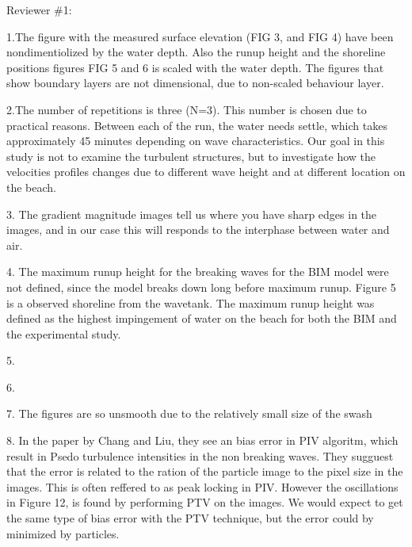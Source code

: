 Reviewer \#1:

1.The figure with the measured surface elevation (FIG 3, and  FIG 4) have been  nondimentiolized  by the water depth. Also the runup height and the shoreline positions figures FIG 5 and 6 is scaled with the water depth. The figures that show boundary layers are not dimensional, due to non-scaled behaviour layer. 


2.The number of repetitions is three (N=3). This number is chosen due to practical reasons. Between each of the run, the water needs settle, which takes approximately 45 minutes depending on wave characteristics. Our goal in this study is not to examine the turbulent structures, but to investigate how the velocities profiles changes due to different wave height and at different location on the beach.

3. The gradient magnitude images tell us where you have sharp edges in the images, and in our case this will responds to the interphase between water and air. 



4. The maximum runup height for the breaking waves for the BIM model were not defined, since the model breaks down long before maximum runup. Figure 5 is a observed shoreline from the wavetank. The maximum runup height was defined as the highest impingement of water on the beach for both the BIM and the experimental study. 

5.


6. 

7. The figures are so unsmooth due to the relatively small size of the swash 


8. In the paper by Chang and Liu, they see an bias error in PIV algoritm, which result in Psedo turbulence intensities in the non breaking waves. They sugguest that the error is related to the ration of the particle image to the pixel size in the images. This is often reffered to as peak locking in PIV. However the oscillations in Figure 12, is found by  performing PTV on the images. We would expect to get the same type of bias error with the PTV technique, but the error could by minimized by particles. 
